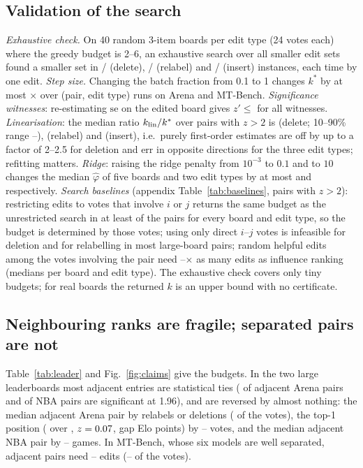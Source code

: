 \documentclass{article}
\newcommand{\kstar}{k^\ast}
\begin{document}
\subsection{Validation of the search}\label{sec:valid}
\emph{Exhaustive check.} On 40 random 3-item boards per edit type (24 votes each) where the greedy budget is 2--6, an exhaustive search over all smaller edit sets found a smaller set in \Nvalsubdrop{}/\Nvalndrop{} (delete), \Nvalsubrelabel{}/\Nvalnrelabel{} (relabel) and \Nvalsubinsert{}/\Nvalninsert{} (insert) instances, each time by one edit. \emph{Step size.} Changing the batch fraction from 0.1 to 1 changes $\kstar$ by at most \Nfracmaxratio$\times$ over \Nfracn{} (pair, edit type) runs on Arena and MT-Bench. \emph{Significance witnesses}: re-estimating $\mathrm{se}$ on the edited board gives $z'\le$\Nsigcheckmax{} for all \Nsigcheckn{} witnesses. \emph{Linearisation}: the median ratio $k_{\rm lin}/\kstar$ over pairs with $z>2$ is \Nlinratiodrop{} (delete; 10--90\% range \Nlinratiolodrop--\Nlinratiohidrop), \Nlinratiorelabel{} (relabel) and \Nlinratioinsert{} (insert), i.e.\ purely first-order estimates are off by up to a factor of 2--2.5 for deletion and err in opposite directions for the three edit types; refitting matters. \emph{Ridge}: raising the ridge penalty from $10^{-3}$ to $0.1$ and to $10$ changes the median $\hat\varphi$ of five boards and two edit types by at most \Nridgemaxchgsmall{} and \Nridgemaxchg{} respectively. \emph{Search baselines} (appendix Table~\ref{tab:baselines}, \Nbasepairs{} pairs with $z>2$): restricting edits to votes that involve $i$ or $j$ returns the same budget as the unrestricted search in at least \Nbasetoucheq{} of the pairs for every board and edit type, so the budget is determined by those votes; using only direct $i$--$j$ votes is infeasible for deletion and for relabelling in most large-board pairs; random helpful edits among the votes involving the pair need \Nbaserandmin--\Nbaserandmax$\times$ as many edits as influence ranking (medians per board and edit type). The exhaustive check covers only tiny budgets; for real boards the returned $k$ is an upper bound with no certificate.

\subsection{Neighbouring ranks are fragile; separated pairs are not}\label{sec:frag}
Table~\ref{tab:leader} and Fig.~\ref{fig:claims} give the budgets. In the two large leaderboards most adjacent entries are statistical ties (\Nadjsigarena{} of adjacent Arena pairs and \Nadjsignba{} of NBA pairs are significant at 1.96), and are reversed by almost nothing: the median adjacent Arena pair by \Nadjkarenarelabel{} relabels or \Nadjkarenadrop{} deletions (\Nadjalphaarenadrop{} of the votes), the top-1 position (\texttt{\Narenatopa} over \texttt{\Narenatopb}, $z=0.07$, gap \Narenatopgap{} Elo points) by \NtopOnearenarelabel--\NtopOnearenadrop{} votes, and the median adjacent NBA pair by \Nadjknbarelabel--\Nadjknbadrop{} games. In MT-Bench, whose six models are well separated, adjacent pairs need \NadjkmtgptFourrelabel--\Nadjkmthumandrop{} edits (\Nadjalphamthumanrelabel--\NadjalphamtgptFourdrop{} of the votes).
\end{document}
